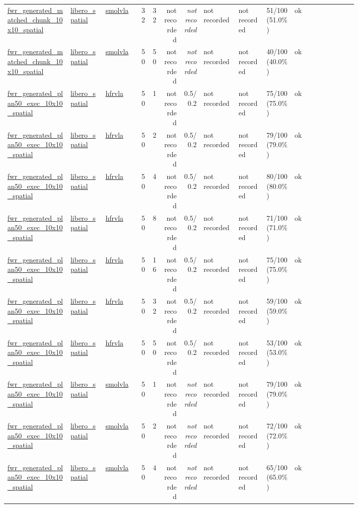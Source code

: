 \begin{tiny}
\begin{longtable}{@{}p{0.18\linewidth}p{0.10\linewidth}p{0.10\linewidth}rrrrp{0.10\linewidth}p{0.08\linewidth}p{0.08\linewidth}p{0.11\linewidth}p{0.07\linewidth}@{}}
\url{fwr_generated_matched_chunk_10x10_spatial} & \url{libero_spatial} & \url{smolvla} & 32 & 32 & not recorded & \emph{not recorded} & not recorded & not recorded & 51/100 (51.0\%) & ok \\
\url{fwr_generated_matched_chunk_10x10_spatial} & \url{libero_spatial} & \url{smolvla} & 50 & 50 & not recorded & \emph{not recorded} & not recorded & not recorded & 40/100 (40.0\%) & ok \\
\url{fwr_generated_plan50_exec_10x10_spatial} & \url{libero_spatial} & \url{hfrvla} & 50 & 1 & not recorded & 0.5/0.2 & not recorded & not recorded & 75/100 (75.0\%) & ok \\
\url{fwr_generated_plan50_exec_10x10_spatial} & \url{libero_spatial} & \url{hfrvla} & 50 & 2 & not recorded & 0.5/0.2 & not recorded & not recorded & 79/100 (79.0\%) & ok \\
\url{fwr_generated_plan50_exec_10x10_spatial} & \url{libero_spatial} & \url{hfrvla} & 50 & 4 & not recorded & 0.5/0.2 & not recorded & not recorded & 80/100 (80.0\%) & ok \\
\url{fwr_generated_plan50_exec_10x10_spatial} & \url{libero_spatial} & \url{hfrvla} & 50 & 8 & not recorded & 0.5/0.2 & not recorded & not recorded & 71/100 (71.0\%) & ok \\
\url{fwr_generated_plan50_exec_10x10_spatial} & \url{libero_spatial} & \url{hfrvla} & 50 & 16 & not recorded & 0.5/0.2 & not recorded & not recorded & 75/100 (75.0\%) & ok \\
\url{fwr_generated_plan50_exec_10x10_spatial} & \url{libero_spatial} & \url{hfrvla} & 50 & 32 & not recorded & 0.5/0.2 & not recorded & not recorded & 59/100 (59.0\%) & ok \\
\url{fwr_generated_plan50_exec_10x10_spatial} & \url{libero_spatial} & \url{hfrvla} & 50 & 50 & not recorded & 0.5/0.2 & not recorded & not recorded & 53/100 (53.0\%) & ok \\
\url{fwr_generated_plan50_exec_10x10_spatial} & \url{libero_spatial} & \url{smolvla} & 50 & 1 & not recorded & \emph{not recorded} & not recorded & not recorded & 79/100 (79.0\%) & ok \\
\url{fwr_generated_plan50_exec_10x10_spatial} & \url{libero_spatial} & \url{smolvla} & 50 & 2 & not recorded & \emph{not recorded} & not recorded & not recorded & 72/100 (72.0\%) & ok \\
\url{fwr_generated_plan50_exec_10x10_spatial} & \url{libero_spatial} & \url{smolvla} & 50 & 4 & not recorded & \emph{not recorded} & not recorded & not recorded & 65/100 (65.0\%) & ok \\

\end{longtable}
\end{tiny}
